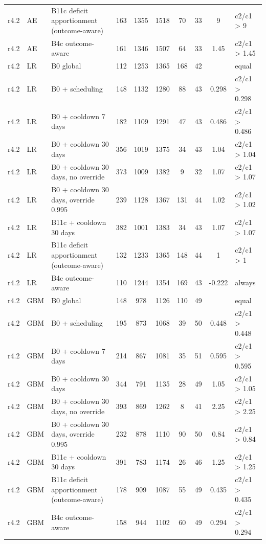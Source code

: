 \documentclass[10pt,onecolumn,letterpaper]{article}
\begin{document}
\begin{longtable}{llp{4.6cm}ccccccl}
r4.2 & AE & B11c deficit apportionment (outcome-aware) & 163 & 1355 & 1518 & 70 & 33 & 9 & c2/c1 > 9 \\
r4.2 & AE & B4c outcome-aware & 161 & 1346 & 1507 & 64 & 33 & 1.45 & c2/c1 > 1.45 \\
r4.2 & LR & B0 global & 112 & 1253 & 1365 & 168 & 42 &  & equal \\
r4.2 & LR & B0 + scheduling & 148 & 1132 & 1280 & 88 & 43 & 0.298 & c2/c1 > 0.298 \\
r4.2 & LR & B0 + cooldown 7 days & 182 & 1109 & 1291 & 47 & 43 & 0.486 & c2/c1 > 0.486 \\
r4.2 & LR & B0 + cooldown 30 days & 356 & 1019 & 1375 & 34 & 43 & 1.04 & c2/c1 > 1.04 \\
r4.2 & LR & B0 + cooldown 30 days, no override & 373 & 1009 & 1382 & 9 & 32 & 1.07 & c2/c1 > 1.07 \\
r4.2 & LR & B0 + cooldown 30 days, override 0.995 & 239 & 1128 & 1367 & 131 & 44 & 1.02 & c2/c1 > 1.02 \\
r4.2 & LR & B11c + cooldown 30 days & 382 & 1001 & 1383 & 34 & 43 & 1.07 & c2/c1 > 1.07 \\
r4.2 & LR & B11c deficit apportionment (outcome-aware) & 132 & 1233 & 1365 & 148 & 44 & 1 & c2/c1 > 1 \\
r4.2 & LR & B4c outcome-aware & 110 & 1244 & 1354 & 169 & 43 & -0.222 & always \\
r4.2 & GBM & B0 global & 148 & 978 & 1126 & 110 & 49 &  & equal \\
r4.2 & GBM & B0 + scheduling & 195 & 873 & 1068 & 39 & 50 & 0.448 & c2/c1 > 0.448 \\
r4.2 & GBM & B0 + cooldown 7 days & 214 & 867 & 1081 & 35 & 51 & 0.595 & c2/c1 > 0.595 \\
r4.2 & GBM & B0 + cooldown 30 days & 344 & 791 & 1135 & 28 & 49 & 1.05 & c2/c1 > 1.05 \\
r4.2 & GBM & B0 + cooldown 30 days, no override & 393 & 869 & 1262 & 8 & 41 & 2.25 & c2/c1 > 2.25 \\
r4.2 & GBM & B0 + cooldown 30 days, override 0.995 & 232 & 878 & 1110 & 90 & 50 & 0.84 & c2/c1 > 0.84 \\
r4.2 & GBM & B11c + cooldown 30 days & 391 & 783 & 1174 & 26 & 46 & 1.25 & c2/c1 > 1.25 \\
r4.2 & GBM & B11c deficit apportionment (outcome-aware) & 178 & 909 & 1087 & 55 & 49 & 0.435 & c2/c1 > 0.435 \\
r4.2 & GBM & B4c outcome-aware & 158 & 944 & 1102 & 60 & 49 & 0.294 & c2/c1 > 0.294 \\

\end{longtable}
\end{document}
